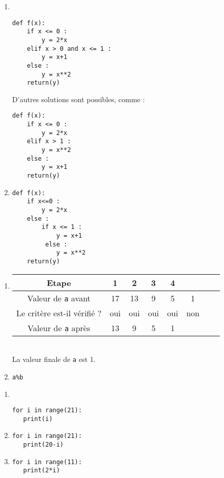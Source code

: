 \begin{solution}
\begin{enumerate}
\item ~\\
\vspace{-0.7cm}
\begin{verbatim}
def f(x):
    if x <= 0 :
        y = 2*x
    elif x > 0 and x <= 1 :
        y = x+1
    else :     
        y = x**2
    return(y)   
\end{verbatim}
D'autres solutions sont possibles, comme :
\begin{verbatim}
def f(x):
    if x <= 0 :
        y = 2*x
    elif x > 1 :
        y = x**2
    else :     
        y = x+1
    return(y)   
\end{verbatim}
\item 
\begin{verbatim}
def f(x):
    if x<=0 :
        y = 2*x
    else :    
        if x <= 1 :
            y = x+1
         else :
            y = x**2
    return(y)   
\end{verbatim}
\end{enumerate}
\end{solution}
\bigskip


\begin{solution}
\begin{enumerate}
\item 
\begin{tabular}{c|c|c|c|c|c|c|c|}
Etape &  1 &2&3 &4 &\\
\hline
Valeur de \verb?a?  avant  & 17 & 13 & 9 & 5 &1\\
Le crit\` ere est-il v\' erifi\' e ? & oui & oui & oui & oui & non \\
Valeur de \verb?a? apr\` es & 13 & 9 & 5 & 1 
\end{tabular}\\
La valeur finale de \verb?a? est 1.
\item \verb?a%b?
\end{enumerate} 
\end{solution}
\bigskip


\begin{solution}
\begin{enumerate}
\item ~\\
\vspace{-0.7cm}
\begin{verbatim}
for i in range(21):
   print(i)
\end{verbatim}
\item 
\begin{verbatim}
for i in range(21):
   print(20-i)
\end{verbatim}
 \item 
\begin{verbatim}
for i in range(11):
   print(2*i)
\end{verbatim}
\end{enumerate} 
\end{solution}
 \bigskip
 

